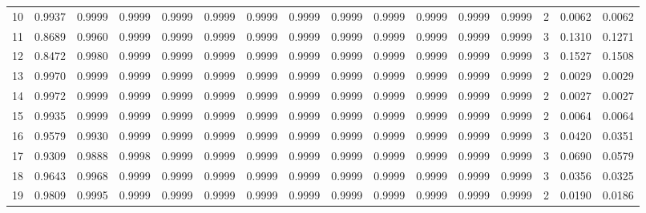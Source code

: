 \begin{tabular}{lrrrrrrrrrrrrrrr}
10 &      0.9937 &  0.9999 &  0.9999 &  0.9999 &  0.9999 &  0.9999 &  0.9999 &  0.9999 &  0.9999 &  0.9999 &   0.9999 &     0.9999 &      2 &                    0.0062 &                     0.0062 \\
11 &      0.8689 &  0.9960 &  0.9999 &  0.9999 &  0.9999 &  0.9999 &  0.9999 &  0.9999 &  0.9999 &  0.9999 &   0.9999 &     0.9999 &      3 &                    0.1310 &                     0.1271 \\
12 &      0.8472 &  0.9980 &  0.9999 &  0.9999 &  0.9999 &  0.9999 &  0.9999 &  0.9999 &  0.9999 &  0.9999 &   0.9999 &     0.9999 &      3 &                    0.1527 &                     0.1508 \\
13 &      0.9970 &  0.9999 &  0.9999 &  0.9999 &  0.9999 &  0.9999 &  0.9999 &  0.9999 &  0.9999 &  0.9999 &   0.9999 &     0.9999 &      2 &                    0.0029 &                     0.0029 \\
14 &      0.9972 &  0.9999 &  0.9999 &  0.9999 &  0.9999 &  0.9999 &  0.9999 &  0.9999 &  0.9999 &  0.9999 &   0.9999 &     0.9999 &      2 &                    0.0027 &                     0.0027 \\
15 &      0.9935 &  0.9999 &  0.9999 &  0.9999 &  0.9999 &  0.9999 &  0.9999 &  0.9999 &  0.9999 &  0.9999 &   0.9999 &     0.9999 &      2 &                    0.0064 &                     0.0064 \\
16 &      0.9579 &  0.9930 &  0.9999 &  0.9999 &  0.9999 &  0.9999 &  0.9999 &  0.9999 &  0.9999 &  0.9999 &   0.9999 &     0.9999 &      3 &                    0.0420 &                     0.0351 \\
17 &      0.9309 &  0.9888 &  0.9998 &  0.9999 &  0.9999 &  0.9999 &  0.9999 &  0.9999 &  0.9999 &  0.9999 &   0.9999 &     0.9999 &      3 &                    0.0690 &                     0.0579 \\
18 &      0.9643 &  0.9968 &  0.9999 &  0.9999 &  0.9999 &  0.9999 &  0.9999 &  0.9999 &  0.9999 &  0.9999 &   0.9999 &     0.9999 &      3 &                    0.0356 &                     0.0325 \\
19 &      0.9809 &  0.9995 &  0.9999 &  0.9999 &  0.9999 &  0.9999 &  0.9999 &  0.9999 &  0.9999 &  0.9999 &   0.9999 &     0.9999 &      2 &                    0.0190 &                     0.0186 \\
\bottomrule
\end{tabular}
